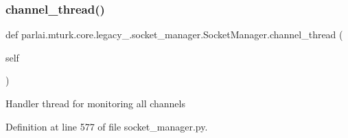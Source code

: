 \subsubsection{\texorpdfstring{channel\+\_\+thread()}{channel\_thread()}}
{\footnotesize\ttfamily def parlai.\+mturk.\+core.\+legacy\+\_.\+socket\+\_\+manager.\+Socket\+Manager.\+channel\+\_\+thread (\begin{DoxyParamCaption}\item[{}]{self }\end{DoxyParamCaption})}

\begin{DoxyVerb}Handler thread for monitoring all channels\end{DoxyVerb}
 

Definition at line 577 of file socket\+\_\+manager.\+py.



